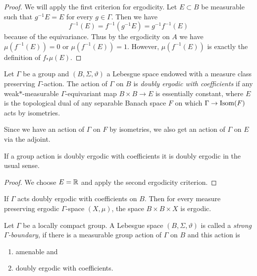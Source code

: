 \begin{proof}
  We will apply the first criterion for ergodicity. Let \(E \subset B\) be measurable such that \(g^{-1} E = E\) for every \(g \in \Gamma\). Then we have
  \[
    f^{-1}(E) = f^{-1}(g^{-1}E) = g^{-1}f^{-1}(E)
  \]
  because of the equivariance. Thus by the ergodicity on \(A\) we have \(\mu(f^{-1}(E))= 0\) or \(\mu(f^{-1}(E)) = 1\). However, \(\mu(f^{-1}(E))\) is exactly the definition of \(f_\ast\mu(E)\).
\end{proof}

\begin{defin}
  Let \(\Gamma\) be a group and \((B, \Sigma, \vartheta)\) a Lebesgue space endowed with a measure class preserving \(\Gamma\)-action. The action of \(\Gamma\) on \(B\) is \emph{doubly ergodic with coefficients} if any weak\(\ast\)-measurable \(\Gamma\)-equivariant map \(B \times B \to E\) is essentially constant, where \(E\) is the topological dual of any separable Banach space \(F\) on which \(\Gamma \to \operatorname{Isom}(F)\) acts by isometries.
\end{defin}

\begin{rem}
  Since we have an action of \(\Gamma\) on \(F\) by isometries, we also get an action of \(\Gamma\) on \(E\) via the adjoint.
\end{rem}

\begin{prop}
  If a group action is doubly ergodic with coefficients it is doubly ergodic in the usual sense.
\end{prop}

\begin{proof}
  We choose \(E = \mathbb{R}\) and apply the second ergodicity criterion.
\end{proof}

\begin{lemma}
  \label{lem:coeff-product}
  If \(\Gamma\) acts doubly ergodic with coefficients on \(B\). Then for every measure preserving ergodic \(\Gamma\)-space \((X, \mu)\), the space \(B \times B \times X\) is ergodic.
\end{lemma}

\begin{defin}
  Let \(\Gamma\) be a locally compact group. A Lebesgue space \((B, \Sigma, \vartheta)\) is called a \emph{strong \(\Gamma\)-boundary}, if there is a measurable group action of \(\Gamma\) on \(B\) and this action is
  \begin{enumerate}
  \item amenable and
  \item doubly ergodic with coefficients.
  \end{enumerate}
\end{defin}


